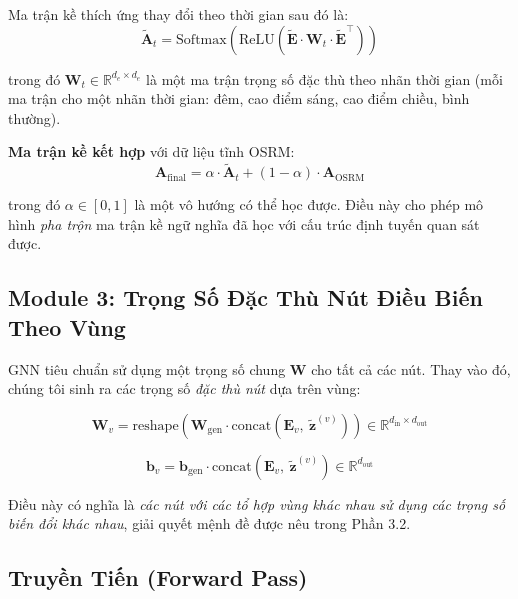 \documentclass[12pt,a4paper]{article}
\begin{document}
Ma trận kề thích ứng thay đổi theo thời gian sau đó là:
\begin{equation}
\tilde{\mathbf{A}}_t = \text{Softmax}\!\left(\text{ReLU}\!\left(
\tilde{\mathbf{E}} \cdot \mathbf{W}_t \cdot \tilde{\mathbf{E}}^\top
\right)\right)
\end{equation}

trong đó $\mathbf{W}_t \in \mathbb{R}^{d_e \times d_e}$ là một ma trận trọng số
đặc thù theo nhãn thời gian (mỗi ma trận cho một nhãn thời gian: đêm, cao điểm sáng, cao điểm chiều, bình thường).

\textbf{Ma trận kề kết hợp} với dữ liệu tĩnh OSRM:
\begin{equation}
\mathbf{A}_{\text{final}} = \alpha \cdot \tilde{\mathbf{A}}_t + (1-\alpha) \cdot \mathbf{A}_{\text{OSRM}}
\end{equation}

trong đó $\alpha \in [0,1]$ là một vô hướng có thể học được. Điều này cho phép mô hình
\textit{pha trộn} ma trận kề ngữ nghĩa đã học với cấu trúc định tuyến quan sát được.

\subsection{Module 3: Trọng Số Đặc Thù Nút Điều Biến Theo Vùng}

GNN tiêu chuẩn sử dụng một trọng số chung $\mathbf{W}$ cho tất cả các nút.
Thay vào đó, chúng tôi sinh ra các trọng số \textit{đặc thù nút} dựa trên vùng:

\begin{equation}
\mathbf{W}_v = \text{reshape}\!\left(
\mathbf{W}_{\text{gen}} \cdot \text{concat}(\mathbf{E}_v,\ \tilde{\mathbf{z}}^{(v)})
\right) \in \mathbb{R}^{d_{\text{in}} \times d_{\text{out}}}
\end{equation}

\begin{equation}
\mathbf{b}_v = \mathbf{b}_{\text{gen}} \cdot \text{concat}(\mathbf{E}_v,\ \tilde{\mathbf{z}}^{(v)})
\in \mathbb{R}^{d_{\text{out}}}
\end{equation}

Điều này có nghĩa là \textit{các nút với các tổ hợp vùng khác nhau sử dụng các trọng số biến đổi khác nhau}, giải quyết mệnh đề được nêu trong Phần 3.2.

\subsection{Truyền Tiến (Forward Pass)}
\end{document}
